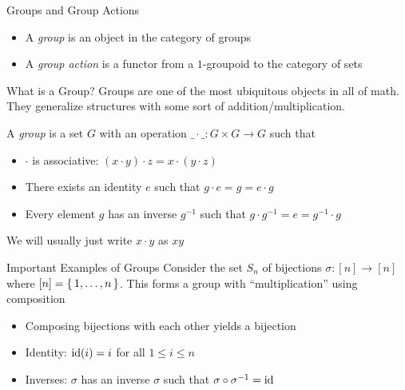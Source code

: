 \documentclass[aspectratio=169]{beamer}
\begin{document}
\begin{frame}{Groups and Group Actions}
    \begin{itemize}
        \item A \emph{group} is an object in the category of groups
        \item A \emph{group action} is a functor from a $1$-groupoid to the category of sets
    \end{itemize}
\end{frame}

\begin{frame}{What is a Group?}
    Groups are one of the most ubiquitous objects in all of math. They generalize structures with some sort of addition/multiplication. \pause

    \begin{defn}
        A \emph{group} is a set $G$ with an operation $\_ \cdot \_ \colon G \times G \to G$ such that
        \begin{itemize}
            \item $\cdot$ is associative: $(x \cdot y) \cdot z = x \cdot (y \cdot z)$ \pause
            \item There exists an identity $e$ such that $g \cdot e = g = e \cdot g$ \pause
            \item Every element $g$ has an inverse $g^{-1}$ such that $g \cdot g^{-1} = e = g^{-1} \cdot g$
        \end{itemize}
    We will usually just write $x \cdot y$ as $xy$
        
    \end{defn}
\end{frame}

\begin{frame}{Important Examples of Groups}
    Consider the set $S_n$ of bijections $\sigma\colon [n] \to [n]$ where $[n] = \set{1, \ldots, n}$. 
    This forms a group with ``multiplication'' using composition\pause
    \begin{itemize}
        \item Composing bijections with each other yields a bijection
        \item Identity: \pause $\operatorname{id}(i) = i$ for all $1 \leq i \leq n$ \pause
        \item Inverses: \pause $\sigma$ has an inverse $\sigma$ such that $\sigma \circ \sigma^{-1} = \operatorname{id}$
    \end{itemize}
\end{frame}
\end{document}
